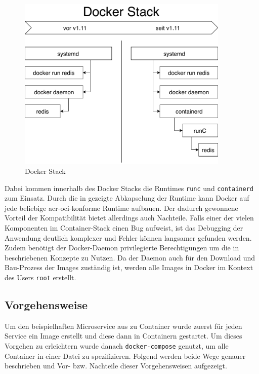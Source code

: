 \begin{figure}[h]
	\begin{center}
		\includegraphics[width=0.9\textwidth]{bilder/docker-stack-containerd-runc.pdf}
		\caption{Docker Stack \citep{RktVsOtherProjects}}
		\label{fig:dockerStack}		
	\end{center}
\end{figure}

Dabei kommen innerhalb des Docker Stacks die Runtimes \texttt{runc} und \texttt{containerd} zum Einsatz. Durch die in  gezeigte Abkapselung der Runtime kann Docker auf jede beliebige \gls{acr-oci}-konforme Runtime aufbauen. Der dadurch gewonnene Vorteil der Kompatibilität bietet allerdings auch Nachteile. Falls einer der vielen Komponenten im Container-Stack einen Bug aufweist, ist das Debugging der Anwendung deutlich komplexer und Fehler können langsamer gefunden werden. Zudem benötigt der Docker-Daemon privilegierte Berechtigungen um die in  beschriebenen Konzepte zu Nutzen. Da der Daemon auch für den Download und Bau-Prozess der Images zuständig ist, werden alle Images in Docker im Kontext des Users \texttt{root} erstellt.

\subsection{Vorgehensweise}
\label{sec:compDockerVorgehen}

Um den beispielhaften Microservice aus  zu Container wurde zuerst für jeden Service ein Image erstellt und diese dann in Containern gestartet. Um dieses Vorgehen zu erleichtern wurde danach \texttt{docker-compose} genutzt, um alle Container in einer Datei zu spezifizieren. Folgend werden beide Wege genauer beschrieben und Vor- bzw. Nachteile dieser Vorgehensweisen aufgezeigt.

